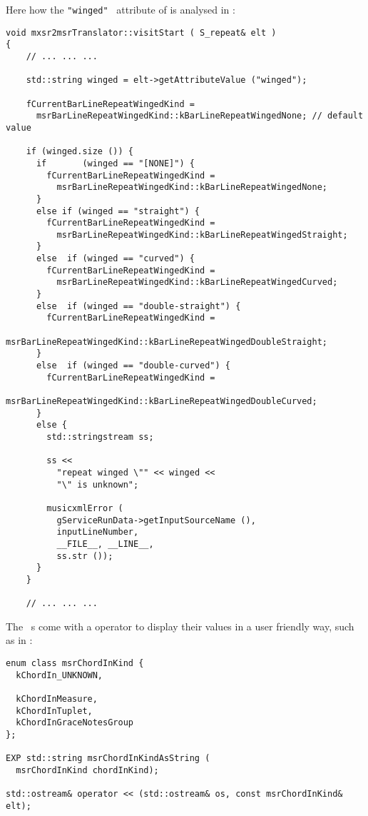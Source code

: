 Here how the {\tt "winged"} \mxml\ attribute of  is analysed in {\tt }:%
\begin{lstlisting}[language=CPlusPlus]
void mxsr2msrTranslator::visitStart ( S_repeat& elt )
{
    // ... ... ...

    std::string winged = elt->getAttributeValue ("winged");

    fCurrentBarLineRepeatWingedKind =
      msrBarLineRepeatWingedKind::kBarLineRepeatWingedNone; // default value

    if (winged.size ()) {
      if       (winged == "[NONE]") {
        fCurrentBarLineRepeatWingedKind =
          msrBarLineRepeatWingedKind::kBarLineRepeatWingedNone;
      }
      else if (winged == "straight") {
        fCurrentBarLineRepeatWingedKind =
          msrBarLineRepeatWingedKind::kBarLineRepeatWingedStraight;
      }
      else  if (winged == "curved") {
        fCurrentBarLineRepeatWingedKind =
          msrBarLineRepeatWingedKind::kBarLineRepeatWingedCurved;
      }
      else  if (winged == "double-straight") {
        fCurrentBarLineRepeatWingedKind =
          msrBarLineRepeatWingedKind::kBarLineRepeatWingedDoubleStraight;
      }
      else  if (winged == "double-curved") {
        fCurrentBarLineRepeatWingedKind =
          msrBarLineRepeatWingedKind::kBarLineRepeatWingedDoubleCurved;
      }
      else {
        std::stringstream ss;

        ss <<
          "repeat winged \"" << winged <<
          "\" is unknown";

        musicxmlError (
          gServiceRunData->getInputSourceName (),
          inputLineNumber,
          __FILE__, __LINE__,
          ss.str ());
      }
    }

    // ... ... ...
\end{lstlisting}

The \mf\ \enumType s come with a \code{$<$$<$} operator to display their values in a user friendly way, such as  in :
\begin{lstlisting}[language=CPlusPlus]
enum class msrChordInKind {
  kChordIn_UNKNOWN,

  kChordInMeasure,
  kChordInTuplet,
  kChordInGraceNotesGroup
};

EXP std::string msrChordInKindAsString (
  msrChordInKind chordInKind);

std::ostream& operator << (std::ostream& os, const msrChordInKind& elt);
\end{lstlisting}

